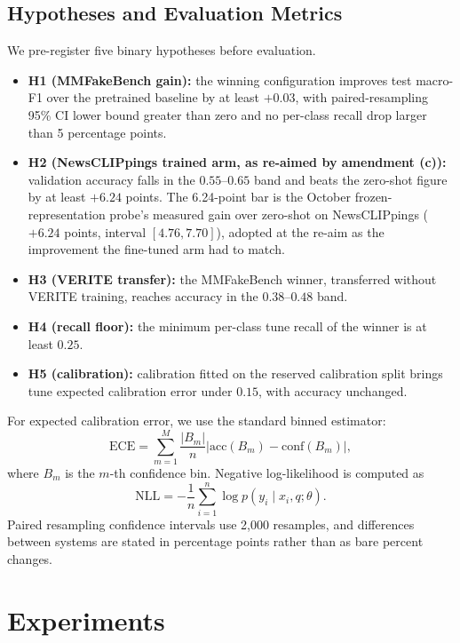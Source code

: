 \documentclass{article} %
\begin{document}
\subsection{Hypotheses and Evaluation Metrics}
We pre-register five binary hypotheses before evaluation.
\begin{itemize}
    \item \textbf{H1 (MMFakeBench gain):} the winning configuration improves test macro-F1 over the pretrained baseline by at least \(+0.03\), with paired-resampling 95\% CI lower bound greater than zero and no per-class recall drop larger than 5 percentage points.
    \item \textbf{H2 (NewsCLIPpings trained arm, as re-aimed by amendment (c)):} validation accuracy falls in the \(0.55\)--\(0.65\) band and beats the zero-shot figure by at least \(+6.24\) points. The 6.24-point bar is the October frozen-representation probe's measured gain over zero-shot on NewsCLIPpings (\(+6.24\) points, interval \([4.76, 7.70]\)), adopted at the re-aim as the improvement the fine-tuned arm had to match.
    \item \textbf{H3 (VERITE transfer):} the MMFakeBench winner, transferred without VERITE training, reaches accuracy in the \(0.38\)--\(0.48\) band.
    \item \textbf{H4 (recall floor):} the minimum per-class tune recall of the winner is at least \(0.25\).
    \item \textbf{H5 (calibration):} calibration fitted on the reserved calibration split brings tune expected calibration error under \(0.15\), with accuracy unchanged.
\end{itemize}

For expected calibration error, we use the standard binned estimator:
\[
\mathrm{ECE}
=
\sum_{m=1}^{M}
\frac{|B_m|}{n}
\left|
\mathrm{acc}(B_m)
-
\mathrm{conf}(B_m)
\right|,
\]
where \(B_m\) is the \(m\)-th confidence bin. Negative log-likelihood is computed as
\[
\mathrm{NLL}
=
-\frac{1}{n}
\sum_{i=1}^n
\log p(y_i\mid x_i,q;\theta).
\]
Paired resampling confidence intervals use 2,000 resamples, and differences between systems are stated in percentage points rather than as bare percent changes.

\section{Experiments}
\label{sec:experiments}
\end{document}
